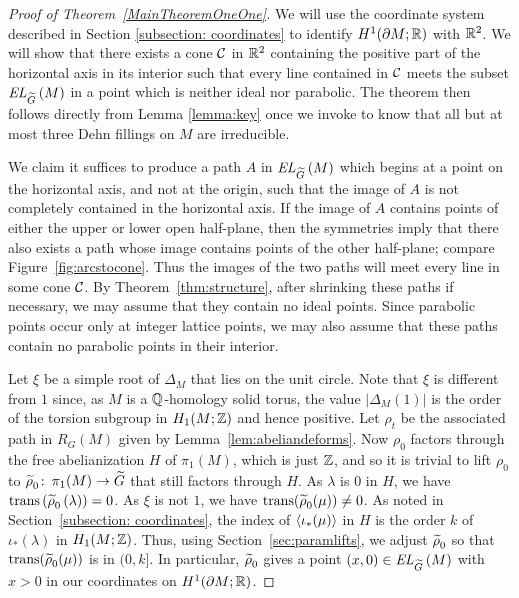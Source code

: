 \documentclass[tikz, sepfignums, defaultenums]{nmd/article}
\newcommand{\RG}[1]{\mathit{R}_{G}\left(#1\right)}
\newcommand{\inc}{\iota}
\DeclareMathOperator{\trans}{trans}
\newcommand{\TEL}[1]{\mathit{EL}_\Gtil\left(#1\right)}
\begin{document}
\begin{proof}[Proof of Theorem~\ref{MainTheoremOneOne}]
We will use the coordinate system described in Section
\ref{subsection: coordinates} to identify $H^1(\partial M; {\mathbb R})$ with
${\mathbb R}^2$.  We will show that there exists a cone ${\mathcal C}$ in ${\mathbb R}^2$
containing the positive part of the horizontal axis in its interior
such that every line contained in ${\mathcal C}$ meets the subset $\TEL{M}$ in a
point which is neither ideal nor parabolic.  The theorem then follows
directly from Lemma \ref{lemma:key} once we invoke \cite[Theorem
1.2]{GordonLuecke1996} to know that all but at most three Dehn
fillings on $M$ are irreducible.

We claim it suffices to produce a path $A$ in $\TEL{M}$ which begins
at a point on the horizontal axis, and not at the origin, such that
the image of $A$ is not completely contained in the horizontal
axis. If the image of $A$ contains points of either the upper or lower
open half-plane, then the symmetries imply that there also exists a
path whose image contains points of the other half-plane; compare
Figure~\ref{fig:arcstocone}.  Thus the images of the two paths will
meet every line in some cone ${\mathcal C}$.  By Theorem~\ref{thm:structure},
after shrinking these paths if necessary, we may assume that they
contain no ideal points.  Since parabolic points occur only at
integer lattice points, we may also assume that these paths contain no
parabolic points in their interior.

Let $\xi$ be a simple root of $\Delta_M$ that lies on the unit
circle.  Note that $\xi$ is different from $1$ since, as $M$ is a
${\mathbb Q}$-homology solid torus, the value $|\Delta_M(1)|$ is the order of the
torsion subgroup in $H_1(M; {\mathbb Z})$ and hence positive. Let $\rho_t$ be
the associated path in $\RG{M}$ given by
Lemma~\ref{lem:abeliandeforms}.  Now $\rho_0$ factors through the
free abelianization $H$ of $\pi_1(M)$, which is just ${\mathbb Z}$, and so it
is trivial to lift $\rho_0$ to $\rhotil_0 \maps \pi_1(M) \to \Gtil$
that still factors through $H$.  As $\lambda$ is $0$ in $H$, we have
$\trans\left(\rhotil_0\left(\lambda\right)\right) = 0$.  As $\xi$ is
not $1$, we have $\trans(\rhotil_0(\mu)) \neq 0$.  As noted in
Section~\ref{subsection: coordinates}, the index of $\pair{\inc_*(\mu)}$
in $H$ is the order $k$ of $\inc_*(\lambda)$ in $H_1(M; {\mathbb Z})$.  Thus,
using Section~\ref{sec:paramlifts}, we adjust $\rhotil_0$ so that
$\trans(\rhotil_0(\mu))$ is in $(0, k]$.  In particular, $\rhotil_0$ gives
a point $(x, 0) \in \TEL{M}$ with $x > 0$ in our coordinates on
$H^1(\partial M; {\mathbb R})$.


\end{proof}
\end{document}

